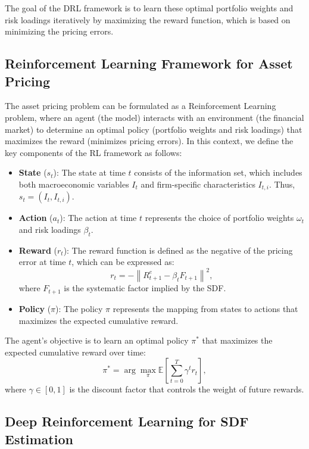 The goal of the DRL framework is to learn these optimal portfolio weights and risk loadings iteratively by maximizing the reward function, which is based on minimizing the pricing errors.

\subsection{Reinforcement Learning Framework for Asset Pricing}

The asset pricing problem can be formulated as a Reinforcement Learning problem, where an agent (the model) interacts with an environment (the financial market) to determine an optimal policy (portfolio weights and risk loadings) that maximizes the reward (minimizes pricing errors). In this context, we define the key components of the RL framework as follows:

\begin{itemize}
    \item \textbf{State} ($s_t$): The state at time $t$ consists of the information set, which includes both macroeconomic variables $I_t$ and firm-specific characteristics $I_{t,i}$. Thus, $s_t = (I_t, I_{t,i})$.
    \item \textbf{Action} ($a_t$): The action at time $t$ represents the choice of portfolio weights $\omega_t$ and risk loadings $\beta_t$.
    \item \textbf{Reward} ($r_t$): The reward function is defined as the negative of the pricing error at time $t$, which can be expressed as:
    \begin{equation}
        r_t = - \left\| R_{t+1}^e - \beta_t F_{t+1} \right\|^2,
    \end{equation}
    where $F_{t+1}$ is the systematic factor implied by the SDF.
    \item \textbf{Policy} ($\pi$): The policy $\pi$ represents the mapping from states to actions that maximizes the expected cumulative reward.
\end{itemize}

The agent's objective is to learn an optimal policy $\pi^*$ that maximizes the expected cumulative reward over time:
\begin{equation}
    \pi^* = \arg \max_\pi \mathbb{E}\left[ \sum_{t=0}^T \gamma^t r_t \right],
\end{equation}
where $\gamma \in [0,1]$ is the discount factor that controls the weight of future rewards.

\subsection{Deep Reinforcement Learning for SDF Estimation}


